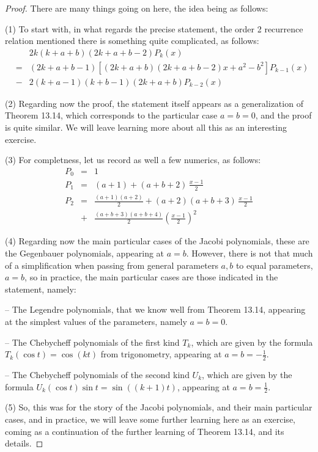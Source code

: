 \documentclass[12pt]{amsbook}
\begin{document}
\begin{proof}
There are many things going on here, the idea being as follows:

\medskip

(1) To start with, in what regards the precise statement, the order 2 recurrence relation mentioned there is something quite complicated, as follows:
\begin{eqnarray*}
&&2k(k+a+b)(2k+a+b-2)P_k(x)\\
&=&(2k+a+b-1)\left[(2k+a+b)(2k+a+b-2)x+a^2-b^2\right]P_{k-1}(x)\\
&-&2(k+a-1)(k+b-1)(2k+a+b)P_{k-2}(x)
\end{eqnarray*}

(2) Regarding now the proof, the statement itself appears as a generalization of Theorem 13.14, which corresponds to the particular case $a=b=0$, and the proof is quite similar. We will leave learning more about all this as an interesting exercise.

\medskip

(3) For completness, let us record as well a few numerics, as follows:
\begin{eqnarray*}
P_0&=&1\\
P_1&=&(a+1)+(a+b+2)\,\frac{x-1}{2}\\
P_2&=&\frac{(a+1)(a+2)}{2}+(a+2)(a+b+3)\,\frac{x-1}{2}\\
&+&\frac{(a+b+3)(a+b+4)}{2}\left(\frac{x-1}{2}\right)^2
\end{eqnarray*}

(4) Regarding now the main particular cases of the Jacobi polynomials, these are the Gegenbauer polynomials, appearing at $a=b$. However, there is not that much of a simplification when passing from general parameters $a,b$ to equal parameters, $a=b$, so in practice, the main particular cases are those indicated in the statement, namely:

\medskip

-- The Legendre polynomials, that we know well from Theorem 13.14, appearing at the simplest values of the parameters, namely $a=b=0$.

\medskip

-- The Chebycheff polynomials of the first kind $T_k$, which are given by the formula $T_k(\cos t)=\cos(kt)$ from trigonometry, appearing at $a=b=-\frac{1}{2}$.

\medskip

-- The Chebycheff polynomials of the second kind $U_k$, which are given by the formula $U_k(\cos t)\sin t=\sin((k+1)t)$, appearing at $a=b=\frac{1}{2}$.

\medskip

(5) So, this was for the story of the Jacobi polynomials, and their main particular cases, and in practice, we will leave some further learning here as an exercise, coming as a continuation of the further learning of Theorem 13.14, and its details.
\end{proof}
\end{document}
